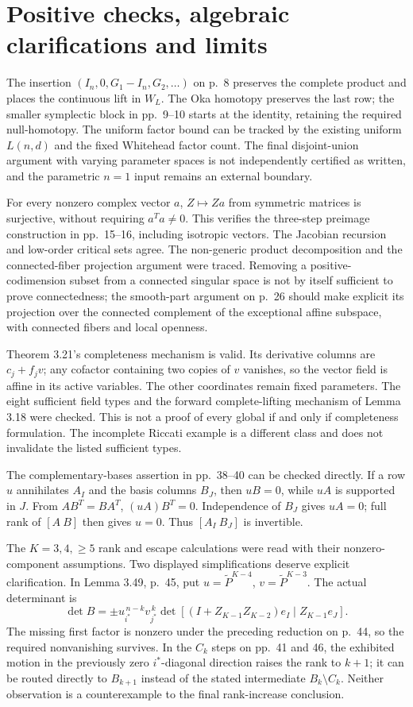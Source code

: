 \documentclass[10pt]{article}
\begin{document}
\section*{Positive checks, algebraic clarifications and limits}
The insertion \((I_n,0,G_1-I_n,G_2,\ldots)\) on p. 8 preserves the complete product and places the continuous lift in \(W_L\). The Oka homotopy preserves the last row; the smaller symplectic block in pp. 9–10 starts at the identity, retaining the required null-homotopy. The uniform factor bound can be tracked by the existing uniform \(L(n,d)\) and the fixed Whitehead factor count. The final disjoint-union argument with varying parameter spaces is not independently certified as written, and the parametric \(n=1\) input remains an external boundary.\par
For every nonzero complex vector \(a\), \(Z\mapsto Za\) from symmetric matrices is surjective, without requiring \(a^Ta\ne0\). This verifies the three-step preimage construction in pp. 15–16, including isotropic vectors. The Jacobian recursion and low-order critical sets agree. The non-generic product decomposition and the connected-fiber projection argument were traced. Removing a positive-codimension subset from a connected singular space is not by itself sufficient to prove connectedness; the smooth-part argument on p. 26 should make explicit its projection over the connected complement of the exceptional affine subspace, with connected fibers and local openness.\par
Theorem 3.21’s completeness mechanism is valid. Its derivative columns are \(c_j+f_jv\); any cofactor containing two copies of \(v\) vanishes, so the vector field is affine in its active variables. The other coordinates remain fixed parameters. The eight sufficient field types and the forward complete-lifting mechanism of Lemma 3.18 were checked. This is not a proof of every global if and only if completeness formulation. The incomplete Riccati example is a different class and does not invalidate the listed sufficient types.\par
The complementary-bases assertion in pp. 38–40 can be checked directly. If a row \(u\) annihilates \(A_I\) and the basis columns \(B_J\), then \(uB=0\), while \(uA\) is supported in \(J\). From \(AB^T=BA^T\), \((uA)B^T=0\). Independence of \(B_J\) gives \(uA=0\); full rank of \([A\ B]\) then gives \(u=0\). Thus \([A_I\ B_J]\) is invertible.\par
The \(K=3,4,\ge5\) rank and escape calculations were read with their nonzero-component assumptions. Two displayed simplifications deserve explicit clarification. In Lemma 3.49, p. 45, put \(u=\widetilde P^{K-4}\), \(v=\widetilde P^{K-3}\). The actual determinant is \[\det B=\pm u_{i^*}^{\,n-k}v_{j^*}^{\,k}
 \det[(I+Z_{K-1}Z_{K-2})e_I\mid Z_{K-1}e_J].              \tag{5}\] The missing first factor is nonzero under the preceding reduction on p. 44, so the required nonvanishing survives. In the \(C_k\) steps on pp. 41 and 46, the exhibited motion in the previously zero \(i^*\)-diagonal direction raises the rank to \(k+1\); it can be routed directly to \(B_{k+1}\) instead of the stated intermediate \(B_k\setminus C_k\). Neither observation is a counterexample to the final rank-increase conclusion.\par
\end{document}
